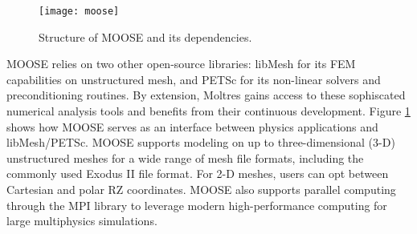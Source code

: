 \begin{figure}[htb!]
	\centering
	\texttt{[image: moose]}
	\caption{Structure of MOOSE and its dependencies.}
	\label{fig:moose}
\end{figure}

MOOSE relies on two other open-source libraries: libMesh
\cite{kirk_libmesh_2006} for its \gls{FEM} capabilities on unstructured mesh,
and PETSc \cite{satish_petsc_2019} for its non-linear solvers and
preconditioning routines. By extension, Moltres gains access to these
sophiscated numerical analysis tools and benefits from their continuous
development. Figure
\ref{fig:moose} shows how MOOSE serves as an interface between physics
applications and libMesh/PETSc. MOOSE supports
modeling on up to three-dimensional (3-D) unstructured meshes for a wide range
of mesh file formats, including the commonly used Exodus II file format. For
2-D meshes, users can opt between Cartesian and polar RZ coordinates. MOOSE
also supports parallel computing through the \gls{MPI} library to leverage
modern high-performance computing for large multiphysics simulations.

